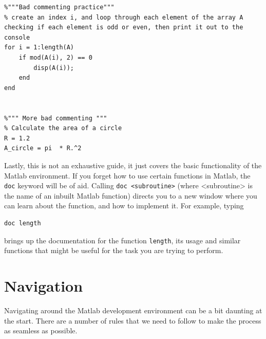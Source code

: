 \documentclass[12pt]{article}
\begin{document}
\begin{lstlisting}
%"""Bad commenting practice"""
% create an index i, and loop through each element of the array A checking if each element is odd or even, then print it out to the console
for i = 1:length(A)
	if mod(A(i), 2) == 0
    	disp(A(i));
    end
end


%""" More bad commenting """
% Calculate the area of a circle
R = 1.2
A_circle = pi  * R.^2
\end{lstlisting}

Lastly, this is not an exhaustive guide, it just covers the basic functionality of the Matlab environment. If you forget how to use certain functions in Matlab, the \texttt{doc} keyword will be of aid. Calling \texttt{doc <subroutine>} (where <subroutine> is the name of an inbuilt Matlab function) directs you to a new window where you can learn about the function, and how to implement it. For example, typing
\begin{lstlisting}
doc length
\end{lstlisting}
brings up the documentation for the function \texttt{length}, its usage and similar functions that might be useful for the task you are trying to perform.

\section{Navigation}
Navigating around the Matlab development environment can be a bit daunting at the start. There are a number of rules that we need to follow to make the process as seamless as possible.
\end{document}
